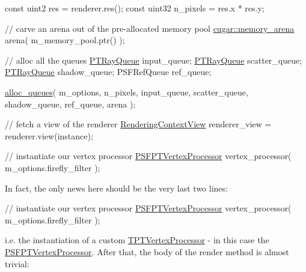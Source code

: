 \begin{DoxyCodeInclude}
    \textcolor{keyword}{const} uint2 res = renderer.res();
    \textcolor{keyword}{const} uint32 n\_pixels = res.x * res.y;
    
    \textcolor{comment}{// carve an arena out of the pre-allocated memory pool}
    \hyperlink{structcugar_1_1memory__arena}{cugar::memory\_arena} arena( m\_memory\_pool.ptr() );

    \textcolor{comment}{// alloc all the queues}
    \hyperlink{struct_p_t_ray_queue}{PTRayQueue}  input\_queue;
    \hyperlink{struct_p_t_ray_queue}{PTRayQueue}  scatter\_queue;
    \hyperlink{struct_p_t_ray_queue}{PTRayQueue}  shadow\_queue;
    PSFRefQueue ref\_queue;

    \hyperlink{group___p_t_lib_gaf8daef8b815f7712ff692edbaa628881}{alloc\_queues}(
        m\_options,
        n\_pixels,
        input\_queue,
        scatter\_queue,
        shadow\_queue,
        ref\_queue,
        arena );

    \textcolor{comment}{// fetch a view of the renderer}
    \hyperlink{struct_rendering_context_view}{RenderingContextView} renderer\_view = renderer.view(instance);

    \textcolor{comment}{// instantiate our vertex processor}
    \hyperlink{struct_p_s_f_p_t_vertex_processor}{PSFPTVertexProcessor} vertex\_processor( m\_options.firefly\_filter );
\end{DoxyCodeInclude}
 \begin{DoxyParagraph}{}
In fact, the only news here should be the very last two lines\+:
\end{DoxyParagraph}

\begin{DoxyCodeInclude}
    \textcolor{comment}{// instantiate our vertex processor}
    \hyperlink{struct_p_s_f_p_t_vertex_processor}{PSFPTVertexProcessor} vertex\_processor( m\_options.firefly\_filter );
\end{DoxyCodeInclude}
 i.\+e. the instantiation of a custom \hyperlink{_p_t_lib_page_TPTVertexProcessor}{T\+P\+T\+Vertex\+Processor} -\/ in this case the \hyperlink{struct_p_s_f_p_t_vertex_processor}{P\+S\+F\+P\+T\+Vertex\+Processor}. After that, the body of the render method is almost trivial\+:


